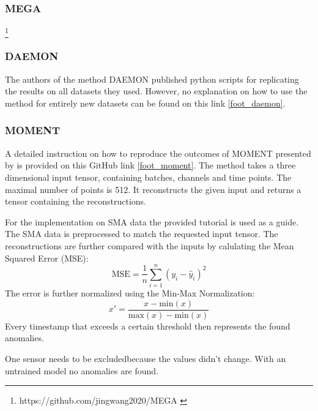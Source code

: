 \subsubsection{MEGA}
\footnote{\fussy\tiny https://github.com/jingwang2020/MEGA \label{test}}

\subsubsection{DAEMON}
The authors of the method DAEMON published python scripts for replicating the results on all datasets they used. However, no explanation on how to use the method for entirely new datasets can be found on this link \ref{foot_daemon}.

\subsubsection{MOMENT}
A detailed instruction on how to reproduce the outcomes of MOMENT presented by \cite{goswami_moment_2024} is provided on this GitHub link \ref{foot_moment}. The method takes a three dimensional input tensor, containing batches, channels and time points. The maximal number of points is 512. It reconstructs the given input and returns a tensor containing the reconstructions.

For the implementation on SMA data the provided tutorial is used as a guide. The SMA data is preprocessed to match the requested input tensor. The reconstructions are further compared with the inputs by calulating the Mean Squared Error (MSE):
\begin{equation}
    \text{MSE} = \frac{1}{n} \sum_{i=1}^{n} \left( y_i - \hat{y}_i \right)^2
\end{equation}
The error is further normalized using the Min-Max Normalization:
\begin{equation}
x' = \frac{x - \text{min}(x)}{\text{max}(x) - \text{min}(x)}
\end{equation}
Every timestamp that exceeds a certain threshold then represents the found anomalies.

One sensor needs to be excludedbecause the values didn't change.
With an untrained model no anomalies are found.

